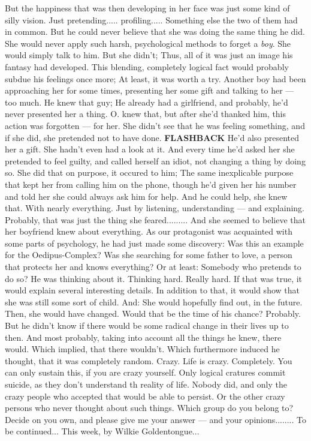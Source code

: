 But the happiness that was then developing in her face was just some kind of silly vision. 
Just pretending..... profiling.....
Something else the two of them had in common. 
But he could never believe that she was doing the same thing he did. 
She would never apply such harsh, psychological methods to forget a \emph{boy}. She would simply talk to him. 
But she didn't; Thus, all of it was just an image his fantasy had developed. 
This blending, completely logical fact would probably subdue his feelings once more; At least, it was worth a try. 
Another boy had been approaching her for some times, presenting her some gift and talking to her --- too much. 
He knew that guy; He already had a girlfriend, and probably, he'd never presented her a thing. 
O. knew that, but after she'd thanked him, this action was forgotten --- for her. 
She didn't see that he was feeling something, and if she did, she pretended not to have done. 
\textbf{FLASHBACK}
He'd also presented her a gift. 
She hadn't even had a look at it.
And every time he'd asked her she pretended to feel guilty, and called herself an idiot, not changing a thing by doing so. 
She did that on purpose, it occured to him; The same inexplicable purpose that kept her from calling him on the phone, though he'd given her his number and told her she could always ask him for help. 
And he could help, she knew that. 
With nearly everything. 
Just by listening, understanding --- and explaining. 
Probably, that was just the thing she feared.........
And she seemed to believe that her boyfriend knew about everything. 
As our protagonist was acquainted with some parts of psychology, he had just made some discovery: Was this an example for the Oedipus-Complex? Was she searching for some father to love, a person that protects her and knows everything?
Or at least: Somebody who pretends to do so?
He was thinking about it. 
Thinking hard. 
Really hard. 
If that was true, it would explain several interesting details. 
In addition to that, it would show that she was still some sort of child. 
And: She would hopefully find out, in the future. 
Then, she would have changed. 
Would that be the time of his chance?
Probably. 
But he didn't know if there would be some radical change in their lives up to then. 
And most probably, taking into account all the things he knew, there would. 
Which implied, that there wouldn't. 
Which furthermore induced he thought, that it was completely random. 
Crazy. 
Life is crazy. 
Completely. 
You can only sustain this, if you are crazy yourself. Only logical cratures commit suicide, as they don't understand th reality of life. 
Nobody did, and only the crazy people who accepted that would be able to persist. 
Or the other crazy persons who never thought about such things. 
Which group do you belong to?
Decide on you own, and please give me your answer --- and your opinions........
To be continued...
This week, by Wilkie Goldentongue...

